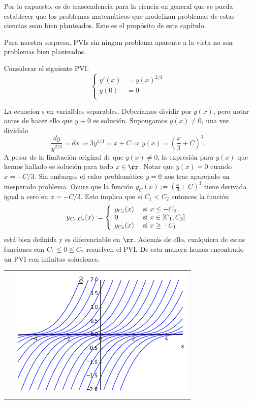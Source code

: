 Por lo expuesto, es de trascendencia para la ciencia en general que se pueda establecer que los problemas matemáticos que modelizan problemas de estas ciencias sean bien planteados. Este es el propósito de este capítulo.


Para nuestra sorpresa, PVIs sin ningun problema aparente a la vista no son problemas bien planteados.

\begin{ejemplo}{} Considerar el siguiente PVI:
\[
  \left\{
 \begin{array}{ll}
    y'(x)&=y(x)^{2/3}\\
    y(0)&=0\\
 \end{array}
 \right.
\]

La ecuacion  s en varialbles separables. Deberíamos dividir por $y(x)$, pero notar antes de hacer ello que $y\equiv 0$ es solución. Supongamos $y(x)\neq 0$, una vez dividido
\[\frac{dy}{y^{2/3}}=dx\Rightarrow 3y^{1/3}=x+C\Rightarrow y(x)=\left(\frac{x}{3}+C\right)^3.\]
A pesar de la limitación original de que $y(x)\neq 0$, la expresión para $y(x)$ que hemos hallado es solución para todo $x\in\rr$. Notar que  $y(x)=0$ cuando $x=-C/3$. Sin embargo, el valor problemático $y=0$ nos trae aparejado un inesperado problema. Ocure  que la función $y_C(x):=\left(\frac{x}{3}+C\right)^3$ tiene derivada igual a cero en $x=-C/3$. Esto implica que si $C_1<C_2$ entonces la función 
\[
  y_{C_1,C_2}(x):=
  \left\{
 \begin{array}{ll}
    y_{C_1}(x)&\hbox{ si } x\leq-C_2\\
    0         &\hbox{ si } x\in [C_1,C_2]\\
    y_{C_2}(x) &\hbox{ si } x\geq -C_1\\
  \end{array}
 \right.
\]
está bien definida y es diferenciable en $\rr$. Además de ello, cualquiera de estas funciones con $C_1\leq 0 \leq C_2$ resuelven el PVI.  De esta manera hemos encontrado un PVI con infinitas soluciones.
\end{ejemplo}

\begin{tabular}{m{6cm} m{6cm}}
\begin{minipage}{6cm}
  
\end{minipage}

&
\includegraphics[scale=.4]{imagenes/no-unicidad.png}
 \end{tabular}





